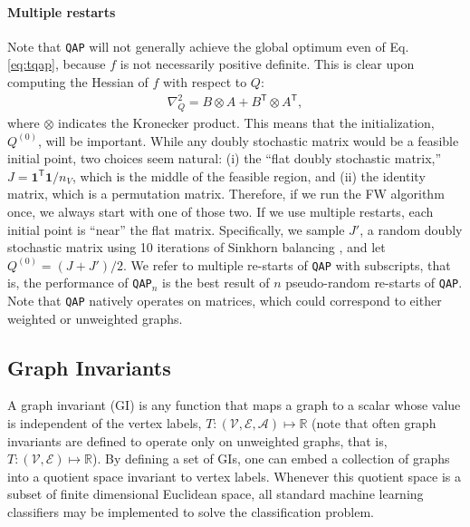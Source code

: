 \documentclass{article} %
\providecommand{\ve}[1]{\boldsymbol{#1}}
\newcommand{\T}{^{\ensuremath{\mathsf{T}}}}           %
\providecommand{\mc}[1]{\mathcal{#1}}
\newcommand{\Real}{\mathbb{R}}
\newcommand{\qap}{\texttt{QAP} }
\newcommand{\qapn}{\texttt{QAP$_n$} }
\begin{document}

\paragraph{Multiple restarts} %
\label{par:putting_it_all_together}


Note that \qap will not generally achieve the global optimum even of Eq. \eqref{eq:tqap}, because $f$ is not necessarily positive definite.  This is clear upon computing the Hessian of $f$  with respect to $Q$:
\begin{align}
	\nabla_Q^2  =  B \otimes A + B\T \otimes A\T,
\end{align}
where $\otimes$ indicates the Kronecker product. This means that the initialization, $Q^{(0)}$, will be important.  While any doubly stochastic matrix would be a feasible initial point, two choices seem natural: (i) the ``flat doubly  stochastic matrix,'' $J=\ve{1}\T \ve{1}/n_V$, which is the middle of the feasible region, and (ii) the identity matrix, which is a permutation matrix.  Therefore, if we run the FW algorithm once, we always start with one of those two.  If we use multiple restarts, each initial point is ``near'' the flat matrix.  Specifically, we sample $J'$, a random doubly stochastic matrix using 10 iterations of Sinkhorn balancing \cite{Sinkhorn1964}, and let $Q^{(0)}=(J+J')/2$.  We refer to multiple re-starts of \qap with subscripts, that is, the performance of \qapn is the best result of $n$ pseudo-random re-starts of \texttt{QAP}.  Note that \qap natively operates on matrices, which could correspond to either weighted or unweighted graphs.



\subsection{Graph Invariants} %
\label{sub:graph_invariants}

A graph invariant (GI) is any function that maps a graph to a scalar whose value is independent of the vertex labels, $T: (\mc{V},\mc{E},\mc{A}) \mapsto \Real$ (note that often graph invariants are defined to operate only on unweighted graphs, that is, $T: (\mc{V},\mc{E}) \mapsto \Real$).  By defining a set of GIs, one can embed a collection of graphs into a quotient space invariant to vertex labels.  Whenever this quotient space is a subset of finite dimensional Euclidean space, all standard machine learning classifiers may be implemented to solve the classification problem.  
\end{document}
